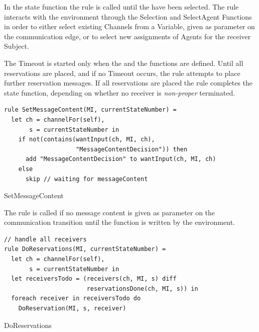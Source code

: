 In the state function the  rule is called until
the  have been selected. The  rule
interacts with the environment through the Selection and SelectAgent Functions
in order to either select existing Channels from a Variable, given as parameter
on the communication edge, or to select new assignments of Agents for the receiver
Subject.

The Timeout is started only when the  and the
 functions are defined. Until all reservations are
placed, and if no Timeout occurs, the  rule attempts
to place further reservation messages. If all reservations are placed the
 rule completes the state function, depending
on whether no receiver is \textit{non-proper} terminated.


\begin{listing}[htbp]
\begin{verbatim}
rule SetMessageContent(MI, currentStateNumber) =
  let ch = channelFor(self),
       s = currentStateNumber in
    if not(contains(wantInput(ch, MI, ch),
                    "MessageContentDecision")) then
      add "MessageContentDecision" to wantInput(ch, MI, ch)
    else
      skip // waiting for messageContent
\end{verbatim}
\caption{SetMessageContent}
\label{lst:shortasm:SetMessageContent}
\end{listing}



The  rule is called if no message content is
given as parameter on the communication transition until the 
function is written by the environment.





\begin{listing}[htbp]
\begin{verbatim}
// handle all receivers
rule DoReservations(MI, currentStateNumber) =
  let ch = channelFor(self),
       s = currentStateNumber in
  let receiversTodo = (receivers(ch, MI, s) diff
                       reservationsDone(ch, MI, s)) in
  foreach receiver in receiversTodo do
    DoReservation(MI, s, receiver)
\end{verbatim}
\caption{DoReservations}
\label{lst:shortasm:DoReservations}
\end{listing}



